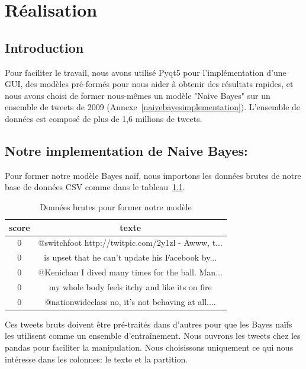 \chapter{Réalisation}
\section{Introduction}
Pour faciliter le travail, nous avons utilisé Pyqt5 pour l'implémentation d'une GUI, des modèles pré-formés pour nous aider à obtenir des résultats rapides, et nous avons choisi de former nous-mêmes un modèle "Naive Bayes" sur un ensemble de tweets de 2009 (Annexe~\ref{naivebayesimplementation}). L'ensemble de données est composé de plus de 1,6 millions de tweets.

\section{Notre implementation de Naive Bayes:}
Pour former notre modèle Bayes naïf, nous importons les données brutes de notre base de données CSV comme dans le tableau~\ref{table:rawData}.
\begin{table}
    \centering
    \begin{tabular}{|c|c|}
        \hline
        score & texte                                             \\ [0.5ex]
        \hline\hline
        0     & @switchfoot http://twitpic.com/2y1zl - Awww, t... \\
        \hline
        0     & is upset that he can't update his Facebook by...  \\
        \hline
        0     & @Kenichan I dived many times for the ball. Man... \\
        \hline
        0     & my whole body feels itchy and like its on fire    \\
        \hline
        0     & @nationwideclass no, it's not behaving at all.... \\ [0.5ex]
        \hline
    \end{tabular}
    \caption{Données brutes pour former notre modèle}
    \label{table:rawData}
\end{table}

Ces tweets bruts doivent être pré-traités dans d'autres pour que les Bayes naïfs les utilisent comme un ensemble d'entraînement. Nous ouvrons les tweets chez les pandas pour faciliter la manipulation. Nous choisissons uniquement ce qui nous intéresse dans les colonnes: le texte et la partition.

